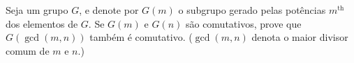 Seja um grupo \(G\), e denote por \(G(m)\) o subgrupo gerado pelas potências \(m^{\text{th}}\) dos elementos de \(G\). Se \(G(m)\) e \(G(n)\) são comutativos, prove que \(G(\operatorname{gcd}(m,n))\) também é comutativo. (\(\operatorname{gcd}(m,n)\) denota o maior divisor comum de \(m\) e \(n\).)
